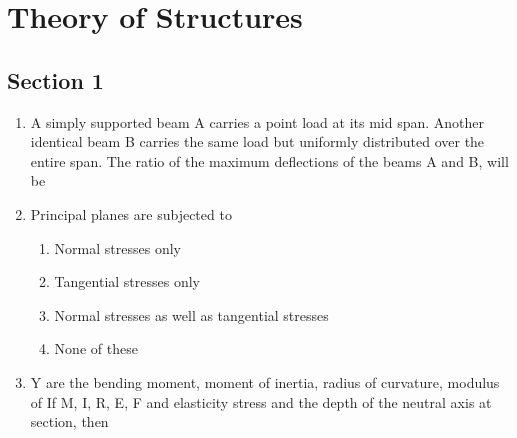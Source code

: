 \documentclass[11pt,a4paper]{article}
\begin{document}
\tableofcontents
\clearpage
{}
\clearpage
\section{Theory of Structures}
\subsection*{Section 1}
\begin{enumerate}
\item{A simply supported beam A carries a point load at its mid span. Another identical beam B carries the same load but uniformly distributed over the entire span. The ratio of the maximum deflections of the beams A and B, will be}
\\
\item{Principal planes are subjected to}
\begin{enumerate}[label=\Alph*.]
\item{Normal stresses only}
\item{Tangential stresses only}
\item{Normal stresses as well as tangential stresses}
\item{None of these}
\end{enumerate}
\item{Y are the bending moment, moment of inertia, radius of curvature, modulus of If M, I, R, E, F and elasticity stress and the depth of the neutral axis at section, then}
\\
\end{enumerate}
\end{document}
